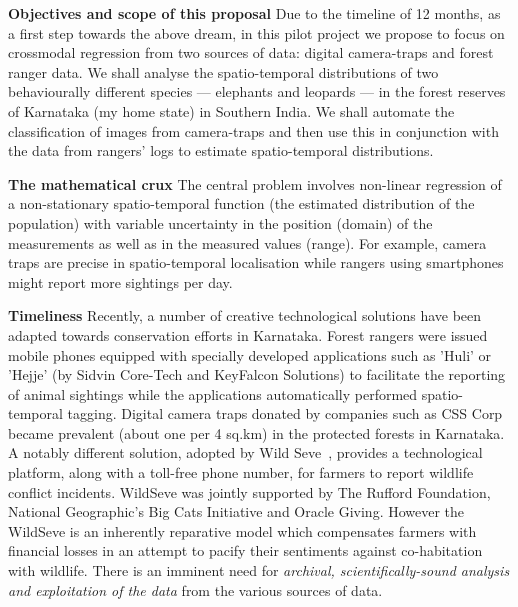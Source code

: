 \documentclass[a4paper,10pt,twocolumn]{article}
\newcommand{\hdg}[1] {\noindent \textbf{#1} }
\begin{document}
\hdg{Objectives and scope of this proposal} 
Due to the timeline of 12 months,  as a first step towards the above dream, in this pilot project we propose to focus on crossmodal regression from two sources of data: digital camera-traps and forest ranger data. We shall analyse the spatio-temporal distributions of two behaviourally different species --- elephants and leopards --- in the forest reserves of Karnataka (my home state) in Southern India. We shall automate the classification of images from camera-traps and then use this in conjunction with the data from rangers' logs to estimate spatio-temporal distributions.

\hdg{The mathematical crux} The central problem involves non-linear regression of a non-stationary spatio-temporal function (the estimated distribution of the population) with variable uncertainty in the position (domain) of the measurements as well as in the measured values (range). For example, camera traps are precise in spatio-temporal localisation while rangers using smartphones might report more sightings per day. 

\hdg{Timeliness}
Recently, a number of creative technological solutions have been adapted towards conservation efforts in Karnataka. Forest rangers were issued mobile phones equipped with specially developed applications such as 'Huli' or 'Hejje' (by Sidvin Core-Tech and KeyFalcon Solutions) to facilitate the reporting of animal sightings while the applications automatically performed spatio-temporal tagging. Digital camera traps donated by companies such as CSS Corp became prevalent (about one per 4 sq.km) in the protected forests in Karnataka. A notably different solution, adopted by Wild Seve~\cite{wildseve}, provides a technological platform, along with a toll-free phone number, for farmers to report wildlife conflict incidents. WildSeve was jointly supported by The Rufford Foundation, National Geographic's Big Cats Initiative and Oracle Giving. However the WildSeve is an inherently reparative model which compensates farmers with financial losses in an attempt to pacify their sentiments against co-habitation with wildlife. There is an imminent need for \textit{archival, scientifically-sound analysis and exploitation of the data} from the various sources of data. 
\end{document}
